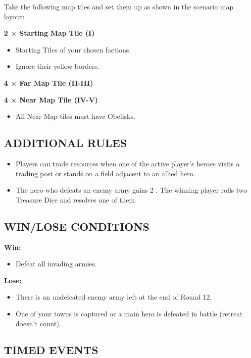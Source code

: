 \begin{multicols*}{2}
Take the following map tiles and set them up as shown in the scenario map layout:

\textbf{2 × Starting Map Tile (I)}
\begin{itemize}
  \item Starting Tiles of your chosen factions.
  \item Ignore their yellow borders.
\end{itemize}

\textbf{4 × Far Map Tile (II-III)}

\textbf{4 × Near Map Tile (IV-V)}
\begin{itemize}
  \item All Near Map tiles must have Obelisks.
\end{itemize}

\subsection*{\MakeUppercase{Additional rules}}

\begin{itemize}
  \item Players can trade resources when one of the active player's heroes visits a trading post or stands on a field adjacent to an allied hero.
  \item The hero who defeats an enemy army gains 2 .
    The winning player rolls two Treasure Dice and resolves one of them.
\end{itemize}

\subsection*{\MakeUppercase{Win/lose conditions}}

\textbf{Win:}
\begin{itemize}
  \item Defeat all invading armies.
\end{itemize}

\textbf{Lose:}
\begin{itemize}
  \item There is an undefeated enemy army left at the end of Round 12.
  \item One of your towns is captured or a main hero is defeated in battle 
  (retreat doesn't count).
\end{itemize}

\subsection*{\MakeUppercase{Timed Events}}


\end{multicols*}
